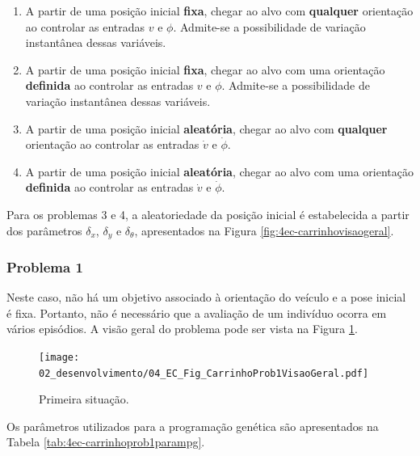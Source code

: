 \begin{enumerate}[label=Problema \arabic*)]
	\item A partir de uma posição inicial \textbf{fixa}, chegar ao alvo com \textbf{qualquer} orientação ao controlar as entradas $v$ e $\phi$. Admite-se a possibilidade de variação instantânea dessas variáveis.
	\item A partir de uma posição inicial \textbf{fixa}, chegar ao alvo com uma orientação \textbf{definida} ao controlar as entradas $v$ e $\phi$. Admite-se a possibilidade de variação instantânea dessas variáveis.
	\item A partir de uma posição inicial \textbf{aleatória}, chegar ao alvo com \textbf{qualquer} orientação ao controlar as entradas $\dot{v}$ e $\dot{\phi}$.
	\item A partir de uma posição inicial \textbf{aleatória}, chegar ao alvo com uma orientação \textbf{definida} ao controlar as entradas $\dot{v}$ e $\dot{\phi}$.
\end{enumerate}

Para os problemas 3 e 4, a aleatoriedade da posição inicial é estabelecida a partir dos parâmetros $\delta_x$, $\delta_y$ e $\delta_\theta$, apresentados na Figura \ref{fig:4ec-carrinhovisaogeral}.

\subsubsection{Problema 1}\label{sssec:4ec-carrinhoprob1}

Neste caso, não há um objetivo associado à orientação do veículo e a pose inicial é fixa. Portanto, não é necessário que a avaliação de um indivíduo ocorra em vários episódios. A visão geral do problema pode ser vista na Figura \ref{fig:4ec-carrinhoprob1visaogeral}.

\begin{figure}[H]
	\centering
	\texttt{[image: 02\_desenvolvimento/04\_EC\_Fig\_CarrinhoProb1VisaoGeral.pdf]}
	\caption{Primeira situação.}
	\label{fig:4ec-carrinhoprob1visaogeral}
\end{figure}

Os parâmetros utilizados para a programação genética são apresentados na Tabela \ref{tab:4ec-carrinhoprob1parampg}.

